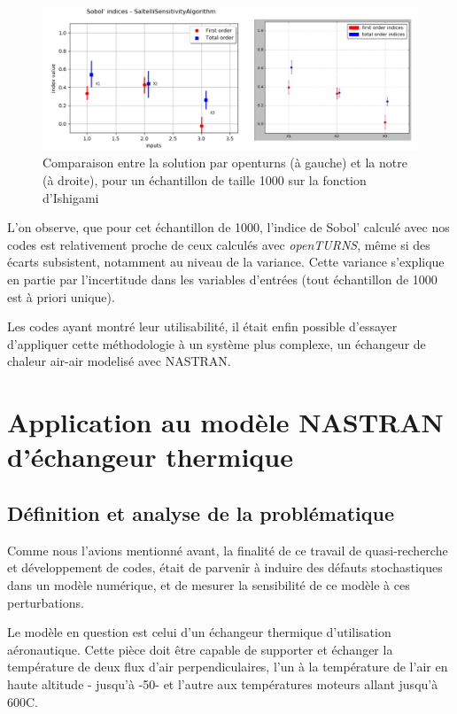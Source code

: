 \documentclass[a4paper,10pt]{article}
\begin{document}
\begin{figure}[H]
   \centering   
   \includegraphics[scale=0.255]{comparisonOtMe.png}
      \caption{Comparaison entre la solution par openturns (à gauche) et la notre (à droite), pour un échantillon de taille 1000 sur la fonction d'Ishigami}
         \label{Comparison}
\end{figure}

L'on observe, que pour cet échantillon de 1000, l'indice de Sobol' calculé avec nos codes est relativement proche de ceux calculés avec \textit{openTURNS}, même si des écarts subsistent, notamment au niveau de la variance. Cette variance s'explique en partie par l'incertitude dans les variables d'entrées (tout échantillon de 1000 est à priori unique).

Les codes ayant montré leur utilisabilité, il était enfin possible d'essayer d'appliquer cette méthodologie à un système plus complexe, un échangeur de chaleur air-air modelisé avec NASTRAN. 
 
\section{Application au modèle NASTRAN d'échangeur thermique}
\subsection{Définition et analyse de la problématique}

Comme nous l'avions mentionné avant, la finalité de ce travail de quasi-recherche et développement de codes, était de parvenir à induire des défauts stochastiques dans un modèle numérique, et de mesurer la sensibilité de ce modèle à ces perturbations. 

Le modèle en question est celui d'un échangeur thermique d'utilisation aéronautique. Cette pièce doit être  capable de supporter et échanger la température de deux flux d'air perpendiculaires, l'un à la température de l'air en haute altitude - jusqu'à -50\degree - et l'autre aux températures moteurs allant jusqu'à 600C. \\
\end{document}

